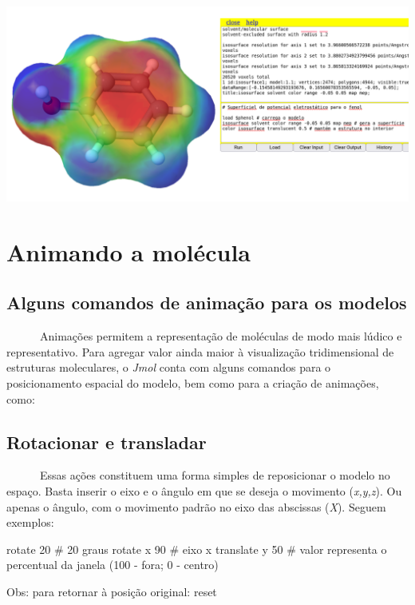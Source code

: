 \documentclass[
  letterpaper,
  DIV=11,
  numbers=noendperiod]{scrreprt}
\newenvironment{Shaded}{\begin{snugshade}}{\end{snugshade}}
\newcommand{\AttributeTok}[1]{\textcolor[rgb]{0.40,0.45,0.13}{#1}}
\newcommand{\CommentTok}[1]{\textcolor[rgb]{0.37,0.37,0.37}{#1}}
\newcommand{\DecValTok}[1]{\textcolor[rgb]{0.68,0.00,0.00}{#1}}
\newcommand{\NormalTok}[1]{\textcolor[rgb]{0.00,0.23,0.31}{#1}}
\newcommand{\SpecialCharTok}[1]{\textcolor[rgb]{0.37,0.37,0.37}{#1}}
\newcommand{\StringTok}[1]{\textcolor[rgb]{0.13,0.47,0.30}{#1}}
\begin{document}
\includegraphics{fenol.png}


\chapter{Animando a molécula}\label{animando-a-moluxe9cula}

\section{Alguns comandos de animação para os
modelos}\label{alguns-comandos-de-animauxe7uxe3o-para-os-modelos}

~~~~~~Animações permitem a representação de moléculas de modo mais
lúdico e representativo. Para agregar valor ainda maior à visualização
tridimensional de estruturas moleculares, o \emph{Jmol} conta com alguns
comandos para o posicionamento espacial do modelo, bem como para a
criação de animações, como:

\section{Rotacionar e transladar}\label{rotacionar-e-transladar}

~~~~~~Essas ações constituem uma forma simples de reposicionar o modelo
no espaço. Basta inserir o eixo e o ângulo em que se deseja o movimento
(\emph{x,y,z}). Ou apenas o ângulo, com o movimento padrão no eixo das
abscissas (\emph{X}). Seguem exemplos:

\begin{Shaded}
\begin{Highlighting}[]
\NormalTok{rotate }\DecValTok{20} \CommentTok{\# 20 graus}
\NormalTok{rotate x }\DecValTok{90} \CommentTok{\# eixo x}
\NormalTok{translate y }\DecValTok{50} \CommentTok{\# valor representa o percentual da janela (100 {-} fora; 0 {-} centro)}

\NormalTok{Obs}\SpecialCharTok{:}\NormalTok{ para retornar à posição original}\SpecialCharTok{:} \StringTok{\textasciigrave{}}\AttributeTok{reset}\StringTok{\textasciigrave{}}
\end{Highlighting}
\end{Shaded}
\end{document}
